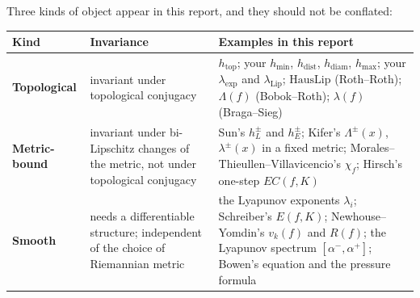 \documentclass[
]{article}
\newcounter{none} %
\begin{document}
Three kinds of object appear in this report, and they should not be
conflated:

{\def\LTcaptype{none} %
\begin{longtable}[]{@{}
  >{\raggedright\arraybackslash}p{}
  >{\raggedright\arraybackslash}p{}
  >{\raggedright\arraybackslash}p{}@{}}
\toprule\noalign{}
\begin{minipage}[b]{\linewidth}\raggedright
Kind
\end{minipage} & \begin{minipage}[b]{\linewidth}\raggedright
Invariance
\end{minipage} & \begin{minipage}[b]{\linewidth}\raggedright
Examples in this report
\end{minipage} \\
\midrule\noalign{}
\endhead
\bottomrule\noalign{}
\endlastfoot
\textbf{Topological} & invariant under topological conjugacy &
\(h_{\mathrm{top}}\); your \(h_{\min}\), \(h_{\mathrm{dist}}\),
\(h_{\mathrm{diam}}\), \(h_{\max}\); your \(\lambda_{\exp}\) and
\(\lambda_{\mathrm{Lip}}\); \(\mathrm{HausLip}\) (Roth--Roth);
\(\Lambda(f)\) (Bobok--Roth); \(\lambda(f)\) (Braga--Sieg) \\
\textbf{Metric-bound} & invariant under bi-Lipschitz changes of the
metric, not under topological conjugacy & Sun's \(h_L^\pm\) and
\(h_E^\pm\); Kifer's \(\Lambda^\pm(x)\), \(\lambda^\pm(x)\) in a fixed
metric; Morales--Thieullen--Villavicencio's \(\chi_f\); Hirsch's
one-step \(EC(f,K)\) \\
\textbf{Smooth} & needs a differentiable structure; independent of the
choice of Riemannian metric & the Lyapunov exponents \(\lambda_i\);
Schreiber's \(E(f,K)\); Newhouse--Yomdin's \(v_k(f)\) and \(R(f)\); the
Lyapunov spectrum \([\alpha^-,\alpha^+]\); Bowen's equation and the
pressure formula \\
\end{longtable}
}
\end{document}
